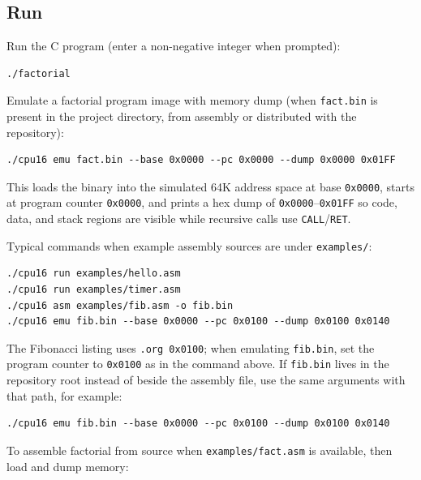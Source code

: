\documentclass[12pt]{article}
\begin{document}
\subsection*{Run}

\noindent
Run the C program (enter a non-negative integer when prompted):

\begin{verbatim}
./factorial
\end{verbatim}

\vspace{0.35in}

\noindent
Emulate a factorial program image with memory dump (when \texttt{fact.bin} is present in the project directory, from assembly or distributed with the repository):

\begin{verbatim}
./cpu16 emu fact.bin --base 0x0000 --pc 0x0000 --dump 0x0000 0x01FF
\end{verbatim}

\noindent
This loads the binary into the simulated 64K address space at base \texttt{0x0000}, starts at program counter \texttt{0x0000}, and prints a hex dump of \texttt{0x0000}--\texttt{0x01FF} so code, data, and stack regions are visible while recursive calls use \texttt{CALL}/\texttt{RET}.

\vspace{0.35in}

\noindent
Typical commands when example assembly sources are under \texttt{examples/}:

\begin{verbatim}
./cpu16 run examples/hello.asm
./cpu16 run examples/timer.asm
./cpu16 asm examples/fib.asm -o fib.bin
./cpu16 emu fib.bin --base 0x0000 --pc 0x0100 --dump 0x0100 0x0140
\end{verbatim}

\noindent
The Fibonacci listing uses \texttt{.org 0x0100}; when emulating \texttt{fib.bin}, set the program counter to \texttt{0x0100} as in the command above. If \texttt{fib.bin} lives in the repository root instead of beside the assembly file, use the same arguments with that path, for example:

\begin{verbatim}
./cpu16 emu fib.bin --base 0x0000 --pc 0x0100 --dump 0x0100 0x0140
\end{verbatim}

\noindent
To assemble factorial from source when \texttt{examples/fact.asm} is available, then load and dump memory:
\end{document}
